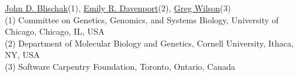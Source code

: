 

\href{https://www.authorea.com/users/5990}{John D. Blischak}(1), \href{https://www.authorea.com/users/16152}{Emily R. Davenport}(2), \href{https://www.authorea.com/users/18131}{Greg Wilson}(3)\\

(1) Committee on Genetics, Genomics, and Systems Biology, University of Chicago, Chicago, IL, USA\\
(2) Department of Molecular Biology and Genetics, Cornell University, Ithaca, NY, USA\\
(3) Software Carpentry Foundation, Toronto, Ontario, Canada
